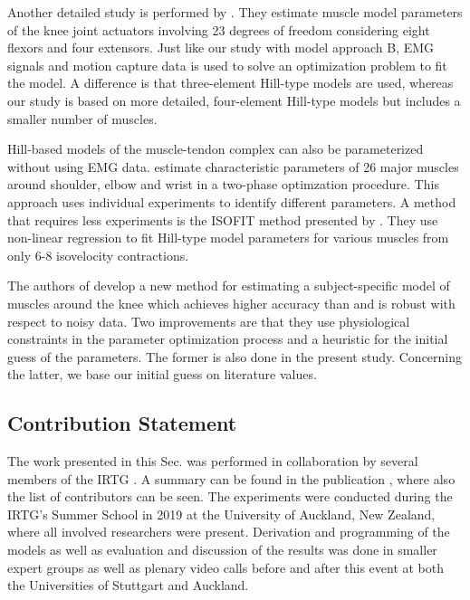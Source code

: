 Another detailed study is performed by \cite{Falisse2016}. They estimate muscle model parameters of the knee joint actuators involving 23 degrees of freedom considering eight flexors and four extensors. Just like our study with model approach B, EMG signals and motion capture data is used to solve an optimization problem to fit the model. A difference is that three-element Hill-type models are used, whereas our study is based on more detailed, four-element Hill-type models but includes a smaller number of muscles.

Hill-based models of the muscle-tendon complex can also be parameterized without using EMG data.
\cite{Garner2003} estimate characteristic parameters of 26 major muscles around shoulder, elbow and  wrist in a two-phase optimzation procedure. This approach uses individual experiments to identify different parameters. A method that requires less experiments is the ISOFIT method presented by \cite{Wagner2005}. They use non-linear regression to fit Hill-type model parameters for various muscles from only 6-8 isovelocity contractions.

The authors of \cite{Campen2014} develop a new method for estimating a subject-specific model of muscles around the knee which achieves higher accuracy than \cite{Garner2003} and is robust with respect to noisy data. Two improvements are that they use physiological constraints in the parameter optimization process and a heuristic for the initial guess of the parameters. The former is also done in the present study. Concerning the latter, we base our initial guess on literature values.

\subsection{Contribution Statement}

The work presented in this Sec. was performed in collaboration by several members of the IRTG . A summary can be found in the publication \cite{summerschool2019}, where also the list of contributors can be seen.
The experiments were conducted during the IRTG's Summer School in 2019 at the University of Auckland, New Zealand, where all involved researchers were present. Derivation and programming of the models as well as evaluation and discussion of the results was done in smaller expert groups as well as plenary video calls before and after this event at both the Universities of Stuttgart and Auckland.

